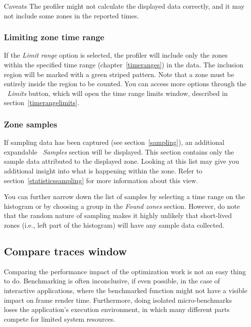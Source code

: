 \documentclass[hidelinks,titlepage,a4paper]{article}
\begin{document}
\begin{bclogo}[
noborder=true,
couleur=black!5,
logo=\bcattention
]{Caveats}
The profiler might not calculate the displayed data correctly, and it may not include some zones in the reported times.
\end{bclogo}

\subsubsection{Limiting zone time range}

If the \emph{Limit range} option is selected, the profiler will include only the zones within the specified time range (chapter~\ref{timeranges}) in the data. The inclusion region will be marked with a green striped pattern. Note that a zone must be entirely inside the region to be counted. You can access more options through the \emph{\faRuler{}~Limits} button, which will open the time range limits window, described in section~\ref{timerangelimits}.

\subsubsection{Zone samples}

If sampling data has been captured (see section~\ref{sampling}), an additional expandable \emph{\faEyeDropper{}~Samples} section will be displayed. This section contains only the sample data attributed to the displayed zone. Looking at this list may give you additional insight into what is happening within the zone. Refer to section~\ref{statisticssampling} for more information about this view.

You can further narrow down the list of samples by selecting a time range on the histogram or by choosing a group in the \emph{Found zones} section. However, do note that the random nature of sampling makes it highly unlikely that short-lived zones (i.e., left part of the histogram) will have any sample data collected.

\subsection{Compare traces window}
\label{compare}

Comparing the performance impact of the optimization work is not an easy thing to do. Benchmarking is often inconclusive, if even possible, in the case of interactive applications, where the benchmarked function might not have a visible impact on frame render time. Furthermore, doing isolated micro-benchmarks loses the application's execution environment, in which many different parts compete for limited system resources.
\end{document}
